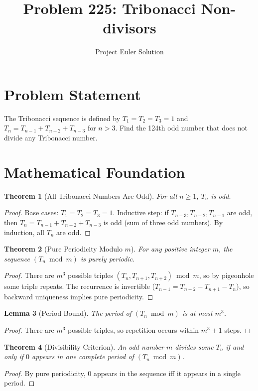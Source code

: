 \documentclass[12pt]{article}
\title{Problem 225: Tribonacci Non-divisors}
\author{Project Euler Solution}
\date{}
\newtheorem{theorem}{Theorem}
\newtheorem{lemma}[theorem]{Lemma}
\begin{document}
\maketitle

\section{Problem Statement}
The Tribonacci sequence is defined by $T_1 = T_2 = T_3 = 1$ and $T_n = T_{n-1} + T_{n-2} + T_{n-3}$ for $n > 3$. Find the 124th odd number that does not divide any Tribonacci number.

\section{Mathematical Foundation}

\begin{theorem}[All Tribonacci Numbers Are Odd]
For all $n \geq 1$, $T_n$ is odd.
\end{theorem}
\begin{proof}
Base cases: $T_1 = T_2 = T_3 = 1$. Inductive step: if $T_{n-3}, T_{n-2}, T_{n-1}$ are odd, then $T_n = T_{n-1} + T_{n-2} + T_{n-3}$ is odd (sum of three odd numbers). By induction, all $T_n$ are odd.
\end{proof}

\begin{theorem}[Pure Periodicity Modulo $m$]
For any positive integer $m$, the sequence $(T_n \bmod m)$ is purely periodic.
\end{theorem}
\begin{proof}
There are $m^3$ possible triples $(T_n, T_{n+1}, T_{n+2}) \bmod m$, so by pigeonhole some triple repeats. The recurrence is invertible ($T_{n-1} = T_{n+2} - T_{n+1} - T_n$), so backward uniqueness implies pure periodicity.
\end{proof}

\begin{lemma}[Period Bound]
The period of $(T_n \bmod m)$ is at most $m^3$.
\end{lemma}
\begin{proof}
There are $m^3$ possible triples, so repetition occurs within $m^3 + 1$ steps.
\end{proof}

\begin{theorem}[Divisibility Criterion]
An odd number $m$ divides some $T_n$ if and only if $0$ appears in one complete period of $(T_n \bmod m)$.
\end{theorem}
\begin{proof}
By pure periodicity, $0$ appears in the sequence iff it appears in a single period.
\end{proof}
\end{document}
